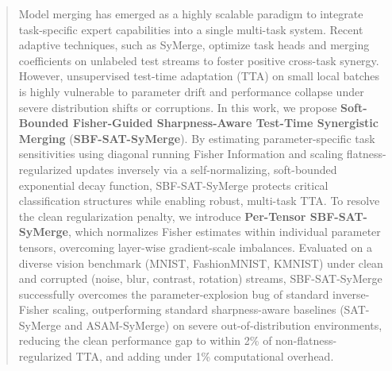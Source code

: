 \documentclass{article}
\theoremstyle{plain}
\theoremstyle{definition}
\theoremstyle{remark}
\begin{document}

\printAffiliationsAndNotice{\icmlequalcontrib}

\begin{abstract}
Model merging has emerged as a highly scalable paradigm to integrate task-specific expert capabilities into a single multi-task system. Recent adaptive techniques, such as SyMerge, optimize task heads and merging coefficients on unlabeled test streams to foster positive cross-task synergy. However, unsupervised test-time adaptation (TTA) on small local batches is highly vulnerable to parameter drift and performance collapse under severe distribution shifts or corruptions. In this work, we propose \textbf{Soft-Bounded Fisher-Guided Sharpness-Aware Test-Time Synergistic Merging} (\textbf{SBF-SAT-SyMerge}). By estimating parameter-specific task sensitivities using diagonal running Fisher Information and scaling flatness-regularized updates inversely via a self-normalizing, soft-bounded exponential decay function, SBF-SAT-SyMerge protects critical classification structures while enabling robust, multi-task TTA. To resolve the clean regularization penalty, we introduce \textbf{Per-Tensor SBF-SAT-SyMerge}, which normalizes Fisher estimates within individual parameter tensors, overcoming layer-wise gradient-scale imbalances. Evaluated on a diverse vision benchmark (MNIST, FashionMNIST, KMNIST) under clean and corrupted (noise, blur, contrast, rotation) streams, SBF-SAT-SyMerge successfully overcomes the parameter-explosion bug of standard inverse-Fisher scaling, outperforming standard sharpness-aware baselines (SAT-SyMerge and ASAM-SyMerge) on severe out-of-distribution environments, reducing the clean performance gap to within 2\% of non-flatness-regularized TTA, and adding under 1\% computational overhead.
\end{abstract}
\end{document}
